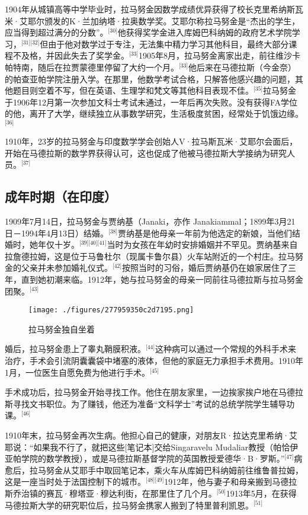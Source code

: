1904年从城镇高等中学毕业时，拉马努金因数学成绩优异获得了校长克里希纳斯瓦米·艾耶尔颁发的K·兰加纳塔·拉奥数学奖。艾耶尔称拉马努金是“杰出的学生，应当得到超过满分的分数”。\(^\text{[30]}\)他获得奖学金进入库姆巴科纳姆的政府艺术学院学习，\(^\text{[31][32]}\)但由于他对数学过于专注，无法集中精力学习其他科目，最终大部分课程不及格，并因此失去了奖学金。\(^\text{[33]}\)1905年8月，拉马努金离家出走，前往维沙卡帕特南，随后在拉贾蒙德里停留了大约一个月。\(^\text{[33]}\)他后来在马德拉斯（今金奈）的帕查亚帕学院注册入学。在那里，他数学考试合格，只解答他感兴趣的问题，其他题目则空着不写，但在英语、生理学和梵文等其他科目表现不佳。\(^\text{[35]}\)拉马努金于1906年12月第一次参加文科士考试未通过，一年后再次失败。没有获得FA学位的他，离开了大学，继续独立从事数学研究，生活极度贫困，经常处于饥饿边缘。\(^\text{[36]}\)

1910年，23岁的拉马努金与印度数学学会创始人V·拉马斯瓦米·艾耶尔会面后，开始在马德拉斯的数学界获得认可，这也促成了他被马德拉斯大学接纳为研究人员。\(^\text{[37]}\)
\subsection{成年时期（在印度）}
1909年7月14日，拉马努金与贾纳基（Janaki，亦作 Janakiammal；1899年3月21日－1994年4月13日）结婚。\(^\text{[38]}\)贾纳基是他母亲一年前为他选定的新娘，当他们结婚时，她年仅十岁。\(^\text{[39][40][41]}\)当时为女孩在年幼时安排婚姻并不罕见。贾纳基来自拉詹德拉姆，这是位于马鲁杜尔（现属卡鲁尔县）火车站附近的一个村庄。拉马努金的父亲并未参加婚礼仪式。\(^\text{[42]}\)按照当时的习俗，婚后贾纳基仍在娘家居住了三年，直到她初潮来临。1912年，她与拉马努金的母亲一同前往马德拉斯与拉马努金团聚。\(^\text{[43]}\)
\begin{figure}[ht]
\centering
\texttt{[image: ./figures/277959350c2d7195.png]}
\caption{拉马努金独自坐着} \label{fig_LMLJ_3}
\end{figure}
婚后，拉马努金患上了睾丸鞘膜积液。\(^\text{[44]}\)这种病可以通过一个常规的外科手术来治疗，手术会引流阴囊囊袋中堵塞的液体，但他的家庭无力承担手术费用。1910年1月，一位医生自愿免费为他进行手术。\(^\text{[45]}\)

手术成功后，拉马努金开始寻找工作。他住在朋友家里，一边挨家挨户地在马德拉斯寻找文书职位。为了赚钱，他还为准备“文科学士”考试的总统学院学生辅导功课。\(^\text{[46]}\)

1910年末，拉马努金再次生病。他担心自己的健康，对朋友R·拉达克里希纳·艾耶说：“如果我不行了，就把这些[笔记本]交给Singaravelu Mudaliar教授（帕恰伊亚帕学院的数学教授），或是马德拉斯基督学院的英国教授爱德华·B·罗斯。”\(^\text{[47]}\)病愈后，拉马努金从艾耶手中取回笔记本，乘火车从库姆巴科纳姆前往维鲁普拉姆，这是一座当时处于法国控制下的城市。\(^\text{[48][49]}\)1912年，他与妻子和母亲搬到马德拉斯乔治镇的赛瓦·穆塔亚·穆达利街，在那里住了几个月。\(^\text{[50]}\)1913年5月，在获得马德拉斯大学的研究职位后，拉马努金携家人搬到了特里普利凯恩。\(^\text{[51]}\)
